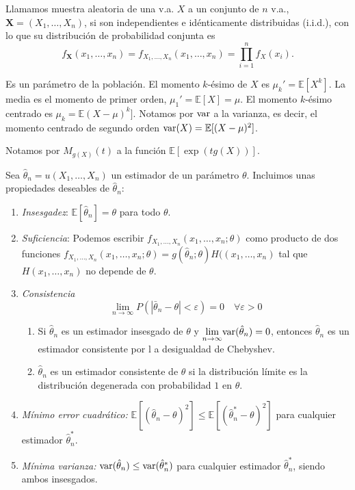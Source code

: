 \begin{definicion}
	Llamamos muestra aleatoria de una v.a. $X$ a un conjunto 
de $n$ v.a., $\mathbf{X} = (X_1, \dots, X_n)$, si son independientes e 
idénticamente distribuidas (i.i.d.), con lo que su 
distribución de probabilidad conjunta es
	\[ 
		f_{\mathbf{X}}(x_1, \dots, x_n) =
		f_{X_1, \dots, X_n}(x_1, \dots, x_n) =
		\prod\limits_{i=1}^n f_X(x_i).
	\]
\end{definicion}
	
\begin{definicion}[Momento]
	Es un parámetro de la población. El momento $k$-ésimo de 
$X$ es $\mu_k' = \mathbb{E}[X^k]$. La media es el momento de 
primer orden, $\mu_1' = \mathbb{E}[X] = \mu$. El momento 
$k$-ésimo centrado es  $\mu_k = \mathbb{E}(X - \mu)^k]$.
Notamos por $\text{var}$ a la varianza, es decir, el momento 
centrado de segundo orden $\text{var}(X) = \mathbb{E}[(X - \mu)^2]$. 
\end{definicion}

\begin{definicion}
	Notamos por $M_{g(X)}(t)$ a la función $\mathbb{E}[
\exp(tg(X))]$. 
\end{definicion}

	Sea $\hat{\theta}_n = u(X_1, \dots, X_n)$ un estimador de 
un parámetro $\theta$. Incluimos unas propiedades deseables 
de $\hat{\theta}_n$:
	
	\begin{enumerate}
	\item \textit{Insesgadez}: 
			$\mathbb{E}[\hat{\theta}_n] = \theta$ para todo $\theta$.
	\item \textit{Suficiencia}: Podemos escribir
			$f_{X_1, \dots, X_n}(x_1, \dots, x_n; \theta)$ 
			como producto de dos funciones $f_{X_1, \dots, 
			X_n}(x_1, \dots, x_n; \theta) = g(\hat{\theta}_n; 
			\theta) H((x_1, \dots, x_n)$ tal que $H(x_1, 
			\dots, x_n)$ no depende de $\theta$.
	\item \textit{Consistencia}
		\[ 
			\lim_{n \rightarrow \infty} 
				P(|\bar{\theta}_n - \theta| < \varepsilon) =
				 0 \quad 
				 \forall \varepsilon > 0 
		\]
	\begin{enumerate}
		\item Si $\hat{\theta}_n$ es un estimador insesgado 
			de $\theta$ y $\underset{n \rightarrow \infty}
			{\lim} \text{var}(\hat{\theta}_n) = 0$, entonces $
			\hat{\theta}_n$ es un estimador consistente por l
			a desigualdad de Chebyshev.
		\item $\hat{\theta}_n$ es un estimador consistente de 
			$\theta$ si la distribución límite es la 
			distribución degenerada con probabilidad $1$ en 
			$\theta$.
	\end{enumerate}
			
	\item \textit{Mínimo error cuadrático:} 	
			$\mathbb{E}[(\hat{\theta}_n - \theta)^2] \leq
			 \mathbb{E}[(\hat{\theta}_n^* - \theta)^2]$ para cualquier 
			 estimador $\hat{\theta}_n^*$.
	\item \textit{Mínima varianza:} $\text{var}(\hat{\theta}_n)
			\leq \text{var}(\hat{\theta}^*_n)$ para cualquier 
			estimador $\hat{\theta}_n^*$, siendo ambos
			insesgados.
	\end{enumerate}
	
